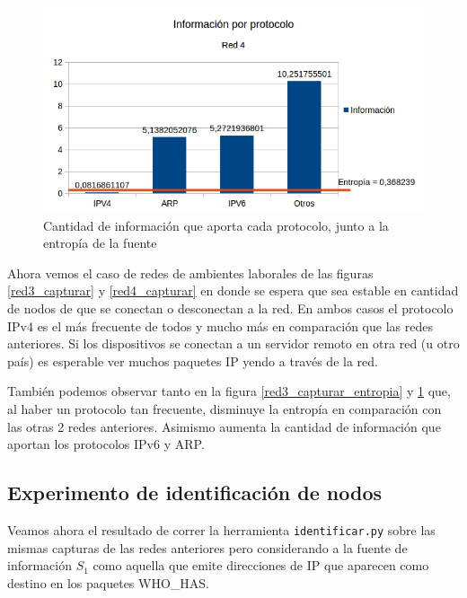 \begin{figure}[H]
	\centering
	\includegraphics[scale=0.65]{imgs/red4_capturar_entropia.png}
	\caption{Cantidad de información que aporta cada protocolo, junto a la entropía de la fuente}
      \label{red4_capturar_entropia}
\end{figure}

Ahora vemos el caso de redes de ambientes laborales de las figuras \ref{red3_capturar} y \ref{red4_capturar} en donde se espera que sea estable en cantidad de nodos de que se conectan o desconectan a la red. En ambos casos el protocolo IPv4 es el más frecuente de todos y mucho más en comparación que las redes anteriores. Si los dispositivos se conectan a un servidor remoto en otra red (u otro país) es esperable ver muchos paquetes IP yendo a través de la red. 

También podemos observar tanto en la figura \ref{red3_capturar_entropia} y \ref{red4_capturar_entropia} que, al haber un protocolo tan frecuente, disminuye la entropía en comparación con las otras 2 redes anteriores. Asimismo aumenta la cantidad de información que aportan los protocolos IPv6 y ARP.


\newpage
\subsection{Experimento de identificación de nodos}

Veamos ahora el resultado de correr la herramienta \texttt{identificar.py} sobre las mismas capturas de las redes anteriores pero considerando a la fuente de información $S_1$ como aquella que emite direcciones de IP que aparecen como destino en los paquetes WHO\_HAS.

